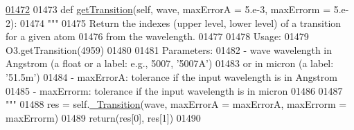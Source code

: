 \begin{DoxyCode}
\hypertarget{classpyneb_1_1core_1_1pynebcore_1_1_atom_l01472}{}\hyperlink{classpyneb_1_1core_1_1pynebcore_1_1_atom_a7c9f17a3d9e841267add92377d9d1ede}{01472} 
01473     \textcolor{keyword}{def }\hyperlink{classpyneb_1_1core_1_1pynebcore_1_1_atom_a7c9f17a3d9e841267add92377d9d1ede}{getTransition}(self, wave, maxErrorA = 5.e-3, maxErrorm = 5.e-2):
01474         \textcolor{stringliteral}{"""}
01475 \textcolor{stringliteral}{        Return the indexes (upper level, lower level) of a transition for a given atom }
01476 \textcolor{stringliteral}{            from the wavelength.}
01477 \textcolor{stringliteral}{        }
01478 \textcolor{stringliteral}{        Usage:}
01479 \textcolor{stringliteral}{            O3.getTransition(4959)}
01480 \textcolor{stringliteral}{            }
01481 \textcolor{stringliteral}{        Parameters:}
01482 \textcolor{stringliteral}{            - wave      wavelength in Angstrom (a float or a label: e.g., 5007, '5007A') }
01483 \textcolor{stringliteral}{                or in micron (a label: '51.5m')}
01484 \textcolor{stringliteral}{            - maxErrorA: tolerance if the input wavelength is in Angstrom}
01485 \textcolor{stringliteral}{            - maxErrorm: tolerance if the input wavelength is in micron}
01486 \textcolor{stringliteral}{                }
01487 \textcolor{stringliteral}{        """} 
01488         res = self.\hyperlink{classpyneb_1_1core_1_1pynebcore_1_1_atom_a69f29cc10c77910841f9e3ff8ddef250}{\_Transition}(wave, maxErrorA = maxErrorA, maxErrorm = maxErrorm)
01489         return(res[0], res[1])
01490         

\end{DoxyCode}
